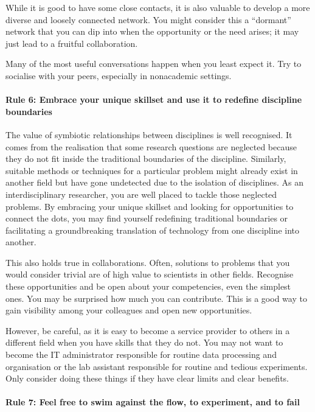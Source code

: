 \documentclass[12pt]{report}
\begin{document}
While it is good to have some close contacts, it is also valuable to develop a more diverse and loosely connected network. You might consider this a “dormant” network that you can dip into when the opportunity or the need arises; it may just lead to a fruitful collaboration.

Many of the most useful conversations happen when you least expect it. Try to socialise with your peers, especially in nonacademic settings.

\paragraph{Rule 6: Embrace your unique skillset and use it to redefine discipline boundaries}

The value of symbiotic relationships between disciplines is well recognised. It comes from the realisation that some research questions are neglected because they do not fit inside the traditional boundaries of the discipline. Similarly, suitable methods or techniques for a particular problem might already exist in another field but have gone undetected due to the isolation of disciplines. As an interdisciplinary researcher, you are well placed to tackle those neglected problems. By embracing your unique skillset and looking for opportunities to connect the dots, you may find yourself redefining traditional boundaries or facilitating a groundbreaking translation of technology from one discipline into another.

This also holds true in collaborations. Often, solutions to problems that you would consider trivial are of high value to scientists in other fields. Recognise these opportunities and be open about your competencies, even the simplest ones. You may be surprised how much you can contribute. This is a good way to gain visibility among your colleagues and open new opportunities.

However, be careful, as it is easy to become a service provider to others in a different field when you have skills that they do not. You may not want to become the IT administrator responsible for routine data processing and organisation or the lab assistant responsible for routine and tedious experiments. Only consider doing these things if they have clear limits and clear benefits.

\paragraph{Rule 7: Feel free to swim against the flow, to experiment, and to fail}
\end{document}
